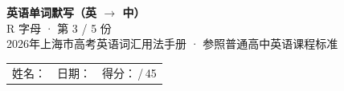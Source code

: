\documentclass[10pt,a4paper]{article}
\begin{document}
\pagestyle{plain}

\begin{center}
{\LARGE\bfseries 英语单词默写（英 $\to$ 中）}\\[0.22em]
{\large R 字母 · 第 3 / 5 份}\\[0.18em]
{\small 2026年上海市高考英语词汇用法手册 · 参照普通高中英语课程标准}
\end{center}

\vspace{0.25em}
\noindent\begin{tabular}{@{}p{}@{}p{}@{}p{}@{}}
姓名：\underline{\hspace{2.0cm}} & 日期：\underline{\hspace{2.0cm}} & 得分：\underline{\hspace{1.3cm}}\,/\,45 \\
\end{tabular}

\vspace{0.3em}

\vspace{0.08em}
\end{document}
